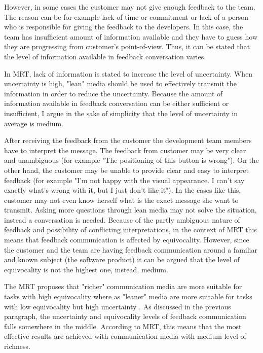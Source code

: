 \documentclass[english,12pt,a4paper,pdftex]{article}
\begin{document}
However, in some cases the customer may not give enough feedback to the team. The reason can be for example lack of time or commitment or lack of a person who is responsible for giving the feedback to the developers. In this case, the team has insufficient amount of information available and they have to guess how they are progressing from customer's point-of-view. Thus, it can be stated that the level of information available in feedback conversation varies. 

In \ac{MRT}, lack of information is stated to increase the level of uncertainty. When uncertainty is high, "lean" media should be used to effectively transmit the information in order to reduce the uncertainty. Because the amount of information available in feedback conversation can be either sufficient or insufficient, I argue in the sake of simplicity that the level of uncertainty in average is medium.

After receiving the feedback from the customer the development team members have to interpret the message. The feedback from customer may be very clear and unambiguous (for example "The positioning of this button is wrong"). On the other hand, the customer may be unable to provide clear and easy to interpret feedback (for example "I'm not happy with the visual appearance. I can't say exactly what's wrong with it, but I just don't like it"). In the cases like this, customer may not even know herself what is the exact message she want to transmit. Asking more questions through lean media may not solve the situation, instead a conversation is needed. Because of the partly ambiguous nature of feedback and possibility of conflicting interpretations, in the context of \ac{MRT} this means that feedback communication is affected by equivocality. However, since the customer and the team are having feedback communication around a familiar and known subject (the software product) it can be argued that the level of equivocality is not the highest one, instead, medium.

The \ac{MRT} proposes that "richer" communication media are more suitable for tasks with high equivocality where as "leaner" media are more suitable for tasks with low equivocality but high uncertainty \citep{daft1986}. As discussed in the previous paragraph, the uncertainty and equivocality levels of feedback communication falls somewhere in the middle. According to \ac{MRT}, this means that the most effective results are achieved with communication media with medium level of richness.
\end{document}
